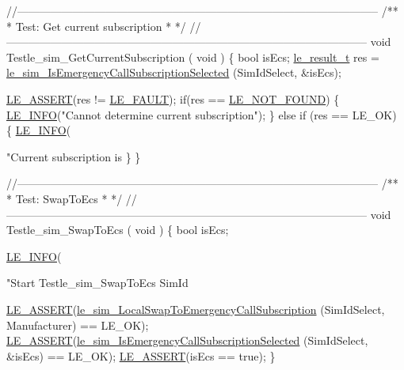 \begin{DoxyCodeInclude}
{{{{{{{{{{\textcolor{comment}{//--------------------------------------------------------------------------------------------------}\textcolor{comment}{}
\textcolor{comment}{/**}
\textcolor{comment}{ * Test: Get current subscription}
\textcolor{comment}{ *}
\textcolor{comment}{ */}
\textcolor{comment}{//--------------------------------------------------------------------------------------------------}
\textcolor{keywordtype}{void} Testle\_sim\_GetCurrentSubscription
(
    \textcolor{keywordtype}{void}
)
\{
    \textcolor{keywordtype}{bool} isEcs;
    \hyperlink{le__basics_8h_a1cca095ed6ebab24b57a636382a6c86c}{le\_result\_t} res = \hyperlink{le__sim__interface_8h_a837cdc0fe30761f4339f846a0b44c5f1}{le\_sim\_IsEmergencyCallSubscriptionSelected}
      (SimIdSelect, &isEcs);

    \hyperlink{le__log_8h_ac0dbbef91dc0fed449d0092ff0557b39}{LE\_ASSERT}(res != \hyperlink{le__basics_8h_a1cca095ed6ebab24b57a636382a6c86cac409634423b6b1ef09643529f6224798}{LE\_FAULT});
    \textcolor{keywordflow}{if}(res == \hyperlink{le__basics_8h_a1cca095ed6ebab24b57a636382a6c86ca77a7505b0443df2fa1bab375c7267637}{LE\_NOT\_FOUND})
    \{
        \hyperlink{le__log_8h_a23e6d206faa64f612045d688cdde5808}{LE\_INFO}(\textcolor{stringliteral}{"Cannot determine current subscription"});
    \}
    \textcolor{keywordflow}{else} \textcolor{keywordflow}{if} (res == LE\_OK)
    \{
        \hyperlink{le__log_8h_a23e6d206faa64f612045d688cdde5808}{LE\_INFO}(\textcolor{stringliteral}{"Current subscription is %
    \}
\}

\textcolor{comment}{//--------------------------------------------------------------------------------------------------}\textcolor{comment}{}
\textcolor{comment}{/**}
\textcolor{comment}{ * Test: SwapToEcs}
\textcolor{comment}{ *}
\textcolor{comment}{ */}
\textcolor{comment}{//--------------------------------------------------------------------------------------------------}
\textcolor{keywordtype}{void} Testle\_sim\_SwapToEcs
(
    \textcolor{keywordtype}{void}
)
\{
    \textcolor{keywordtype}{bool} isEcs;

    \hyperlink{le__log_8h_a23e6d206faa64f612045d688cdde5808}{LE\_INFO}(\textcolor{stringliteral}{"Start Testle\_sim\_SwapToEcs SimId %

    \hyperlink{le__log_8h_ac0dbbef91dc0fed449d0092ff0557b39}{LE\_ASSERT}(\hyperlink{le__sim__interface_8h_aa856f5e094e8182c8d0b07761e309549}{le\_sim\_LocalSwapToEmergencyCallSubscription}
      (SimIdSelect, Manufacturer) == LE\_OK);
    \hyperlink{le__log_8h_ac0dbbef91dc0fed449d0092ff0557b39}{LE\_ASSERT}(\hyperlink{le__sim__interface_8h_a837cdc0fe30761f4339f846a0b44c5f1}{le\_sim\_IsEmergencyCallSubscriptionSelected}
      (SimIdSelect, &isEcs) == LE\_OK);
    \hyperlink{le__log_8h_ac0dbbef91dc0fed449d0092ff0557b39}{LE\_ASSERT}(isEcs == \textcolor{keyword}{true});
\}

}}}}}}}}}}}}
\end{DoxyCodeInclude}
